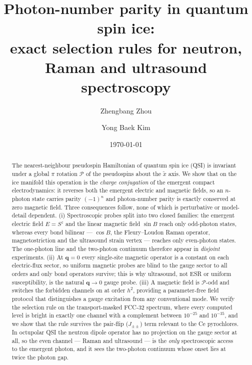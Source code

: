 \documentclass[aps,prl,preprint,amsmath,amssymb,superscriptaddress,
longbibliography,floatfix]{revtex4-2}
\newcommand{\Jpmpm}{J_{\pm\pm}}
\DeclareRobustCommand{\bq}{\bm q}
\newcommand{\PP}{\mathcal{P}}
\begin{document}
\title{Photon-number parity in quantum spin ice:\\
exact selection rules for neutron, Raman and ultrasound spectroscopy}

\author{Zhengbang Zhou}

\author{Yong Baek Kim}

\date{\today}

\begin{abstract}
The nearest-neighbour pseudospin Hamiltonian of quantum spin ice (QSI) is
invariant under a global $\pi$ rotation $\PP$ of the pseudospins about the
$\tilde x$ axis.  We show that on the ice manifold this operation is the
\emph{charge conjugation} of the emergent compact electrodynamics: it reverses
both the emergent electric and magnetic fields, so an $n$-photon state carries
parity $(-1)^n$ and photon-number parity is exactly conserved at zero magnetic
field.  Three consequences follow, none of which is perturbative or
model-detail dependent.  (i) Spectroscopic probes split into two closed
families: the emergent electric field $E=S^z$ and the linear magnetic field
$\sin B$ reach only odd-photon states, whereas every bond bilinear ---
$\cos B$, the Fleury--Loudon Raman operator, magnetostriction and the
ultrasound strain vertex --- reaches only even-photon states.  The one-photon
line and the two-photon continuum therefore appear in \emph{disjoint}
experiments.  (ii) At $\bq=0$ every single-site magnetic operator is a constant
on each electric-flux sector, so uniform magnetic probes are blind to the gauge
sector to all orders and only bond operators survive; this is why ultrasound,
not ESR or uniform susceptibility, is the natural $\bq\to0$ gauge probe.
(iii) A magnetic field is $\PP$-odd and switches the forbidden channels on at
order $h^2$, providing a parameter-free field protocol that distinguishes a
gauge excitation from any conventional mode.  We verify the selection rule on
the transport-masked FCC-32 spectrum, where every computed level is bright in
exactly one channel with a complement between $10^{-25}$ and $10^{-35}$, and we
show that the rule survives the pair-flip ($\Jpmpm$) term relevant to the Ce
pyrochlores.  In octupolar QSI the neutron dipole operator has no projection on
the gauge sector at all, so the even channel --- Raman and ultrasound --- is
the \emph{only} spectroscopic access to the emergent photon, and it sees the
two-photon continuum whose onset lies at twice the photon gap.
\end{abstract}
\end{document}
